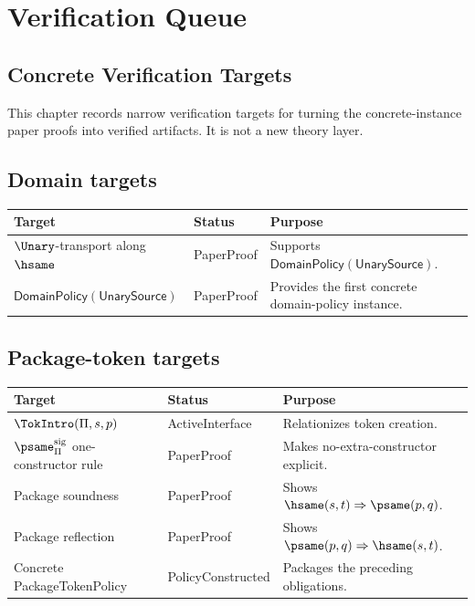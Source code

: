 \chapter{Verification Queue}
\label{ch:proof-obligations-verification-queue}

\section{Concrete Verification Targets}
\label{sec:po-verification-targets-instance}

This chapter records narrow verification targets for turning the concrete-instance paper proofs into verified artifacts. It is not a new theory layer.

\section{Domain targets}
\begin{longtable}{p{}p{}p{}}
\toprule
\textbf{Target} & \textbf{Status} & \textbf{Purpose}\\
\midrule
\(\Unary\)-transport along \(\hsame\) & PaperProof & Supports \(\mathsf{DomainPolicy}(\mathsf{UnarySource})\).\\
\(\mathsf{DomainPolicy}(\mathsf{UnarySource})\) & PaperProof & Provides the first concrete domain-policy instance.\\
\bottomrule
\end{longtable}

\section{Package-token targets}
\begin{longtable}{p{}p{}p{}}
\toprule
\textbf{Target} & \textbf{Status} & \textbf{Purpose}\\
\midrule
\(\TokIntro(\Pi,s,p)\) & ActiveInterface & Relationizes token creation.\\
\(\psame_{\Pi}^{\mathrm{sig}}\) one-constructor rule & PaperProof & Makes no-extra-constructor explicit.\\
Package soundness & PaperProof & Shows \(\hsame(s,t)\Rightarrow\psame(p,q)\).\\
Package reflection & PaperProof & Shows \(\psame(p,q)\Rightarrow\hsame(s,t)\).\\
Concrete PackageTokenPolicy & PolicyConstructed & Packages the preceding obligations.\\
\bottomrule
\end{longtable}

